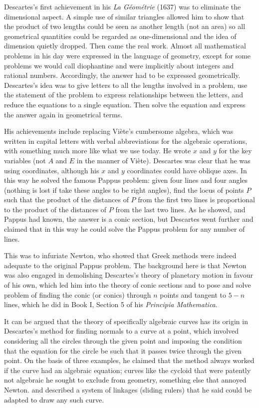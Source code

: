 \documentclass[11pt]{article}
\begin{document}
\bigskip 

Descartes's first achievement in his \emph{La G\'eom\'etrie} (1637) was to eliminate the dimensional aspect. A simple use of similar triangles allowed him to show that the product of two lengths could be seen as another length (not an area) so all geometrical quantities could be regarded as one-dimensional and the idea of dimension quietly dropped. Then came the real work. Almost all mathematical problems in his day were expressed in the language of geometry, except for some problems we would call diophantine and were implicitly about integers and rational numbers. Accordingly, the answer had to be expressed geometrically. Descartes's idea was to give letters to all the lengths involved in a problem, use the statement of the problem to express relationships between the letters, and reduce the equations to a single equation. Then solve the equation and express the answer again in geometrical terms.  

His achievements include replacing Vi\`ete's cumbersome algebra, which was written in capital letters with verbal abbreviations for the algebraic operations, with something much more like   what we use today.  He wrote $x$ and $y$ for the key variables (not $A$ and $E$ in the manner of Vi\`ete). Descartes was clear that he was using coordinates, although his $x$ and $y$ coordinates could have oblique axes. In this way he solved the famous Pappus problem: given four lines and four angles (nothing is lost if take these angles to be right angles), find the locus of points $P$ such that the product of the distances of $P$ from the first two lines is proportional to the product of the distances of $P$ from the last two lines. As he showed, and Pappus had known, the answer is a conic section, but  Descartes went further and claimed that in this way he could solve the Pappus problem for any number of lines. 

This was to infuriate Newton, who showed that Greek methods were indeed adequate to the original Pappus problem. The background here is that Newton was also engaged in demolishing Descartes's theory of planetary motion in favour of his own, which led him into the theory of conic sections and to pose and solve problem of finding the conic (or conics) through $n$ points and tangent to $5-n$ lines, which he did in Book I, Section 5 of his \emph{Principia Mathematica}.~\label{Newtonconics}

It can be argued that the theory of specifically algebraic curves has its origin in Descartes's method for finding normals to a curve at a point, which  involved considering all the circles through the given point and imposing the condition that the equation for the circle be such that it passes twice through the given point. On the basis of three examples, he claimed that the method always worked  if the curve had an algebraic equation; curves like the cycloid that were patently not algebraic he sought to exclude from geometry, something else that annoyed Newton. and described a system of linkages (sliding rulers) that he said could be adapted to draw any such curve.
\end{document}
